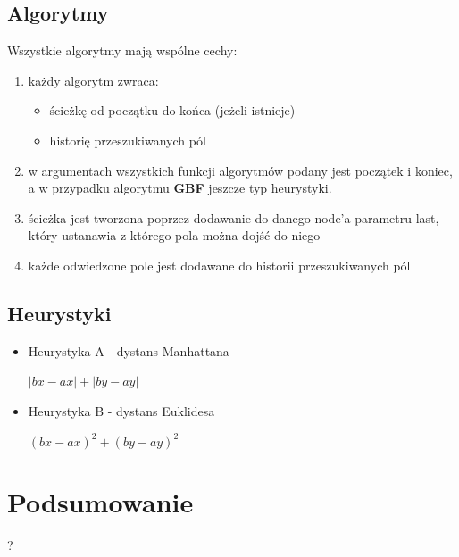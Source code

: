 \documentclass{article}
\begin{document}
\subsection{Algorytmy}
Wszystkie algorytmy mają wspólne cechy:
\begin{enumerate}
	\item każdy algorytm zwraca:
	\begin{itemize}
		\item ścieżkę od początku do końca (jeżeli istnieje)
		\item historię przeszukiwanych pól
	\end{itemize}
	\item w argumentach wszystkich funkcji algorytmów podany jest początek i koniec, a w przypadku algorytmu \textbf{GBF} jeszcze typ heurystyki.
	\item ścieżka jest tworzona poprzez dodawanie do danego node'a parametru last, który ustanawia z którego pola można dojść do niego
	\item każde odwiedzone pole jest dodawane do historii przeszukiwanych pól
\end{enumerate}

\subsection{Heurystyki}
\begin{itemize}
\item Heurystyka A - dystans Manhattana\\
\begin{center}
$|bx-ax|+|by-ay|$
\end{center}
\item Heurystyka B - dystans Euklidesa\\
\begin{center}
$(bx-ax)^2+(by-ay)^2$
\end{center}
\end{itemize}

\section{Podsumowanie}
?
\end{document}
